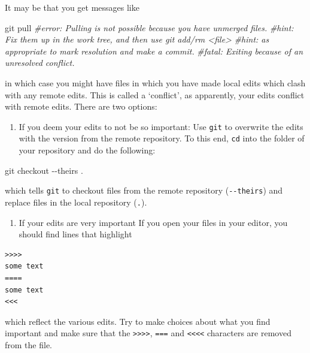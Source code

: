 \documentclass[
]{book}
\newenvironment{Shaded}{\begin{snugshade}}{\end{snugshade}}
\newcommand{\AttributeTok}[1]{\textcolor[rgb]{0.77,0.63,0.00}{#1}}
\newcommand{\CommentTok}[1]{\textcolor[rgb]{0.56,0.35,0.01}{\textit{#1}}}
\newcommand{\FunctionTok}[1]{\textcolor[rgb]{0.00,0.00,0.00}{#1}}
\newcommand{\NormalTok}[1]{#1}
\providecommand{\tightlist}{%
  \setlength{\itemsep}{0pt}\setlength{\parskip}{0pt}}
\begin{document}
It may be that you get messages like

\begin{Shaded}
\begin{Highlighting}[]
\FunctionTok{git}\NormalTok{ pull}
\CommentTok{\#error: Pulling is not possible because you have unmerged files.}
\CommentTok{\#hint: Fix them up in the work tree, and then use \textquotesingle{}git add/rm \textless{}file\textgreater{}\textquotesingle{}}
\CommentTok{\#hint: as appropriate to mark resolution and make a commit.}
\CommentTok{\#fatal: Exiting because of an unresolved conflict.}
\end{Highlighting}
\end{Shaded}

in which case you might have files in which you have made local edits which clash
with any remote edits. This is called a `conflict', as apparently, your edits conflict
with remote edits. There are two options:

\begin{enumerate}
\def\labelenumi{\arabic{enumi}.}
\tightlist
\item
  If you deem your edits to not be so important:
  Use \texttt{git} to overwrite the edits with the version from the remote repository.
  To this end, \texttt{cd} into the folder of your repository and do the following:
\end{enumerate}

\begin{Shaded}
\begin{Highlighting}[]
\FunctionTok{git}\NormalTok{ checkout }\AttributeTok{{-}{-}theirs}\NormalTok{ .}
\end{Highlighting}
\end{Shaded}

which tells \texttt{git} to checkout files from the remote repository (\texttt{-\/-theirs}) and
replace files in the local repository (\texttt{.}).

\begin{enumerate}
\def\labelenumi{\arabic{enumi}.}
\setcounter{enumi}{1}
\tightlist
\item
  If your edits are very important
  If you open your files in your editor, you should find lines that highlight
\end{enumerate}

\begin{verbatim}
>>>>
some text
====
some text
<<<
\end{verbatim}

which reflect the various edits. Try to make choices about what you find important
and make sure that the \texttt{\textgreater{}\textgreater{}\textgreater{}\textgreater{}}, \texttt{===} and \texttt{\textless{}\textless{}\textless{}\textless{}} characters are removed from the file.
\end{document}
